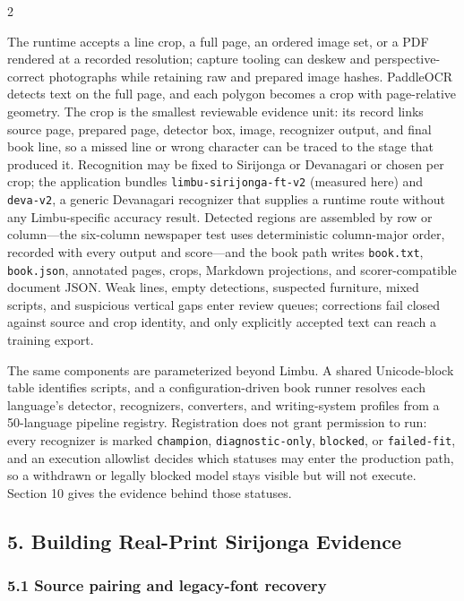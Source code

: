 \documentclass[
  10pt,
]{article}
\begin{document}
\begin{multicols}{2}

The runtime accepts a line crop, a full page, an ordered image set, or a
PDF rendered at a recorded resolution; capture tooling can deskew and
perspective-correct photographs while retaining raw and prepared image
hashes. PaddleOCR detects text on the full page, and each polygon
becomes a crop with page-relative geometry. The crop is the smallest
reviewable evidence unit: its record links source page, prepared page,
detector box, image, recognizer output, and final book line, so a missed
line or wrong character can be traced to the stage that produced it.
Recognition may be fixed to Sirijonga or Devanagari or chosen per crop;
the application bundles \texttt{limbu-sirijonga-ft-v2} (measured here)
and \texttt{deva-v2}, a generic Devanagari recognizer that supplies a
runtime route without any Limbu-specific accuracy result. Detected
regions are assembled by row or column---the six-column newspaper test
uses deterministic column-major order, recorded with every output and
score---and the book path writes \texttt{book.txt}, \texttt{book.json},
annotated pages, crops, Markdown projections, and scorer-compatible
document JSON. Weak lines, empty detections, suspected furniture, mixed
scripts, and suspicious vertical gaps enter review queues; corrections
fail closed against source and crop identity, and only explicitly
accepted text can reach a training export.

The same components are parameterized beyond Limbu. A shared
Unicode-block table identifies scripts, and a configuration-driven book
runner resolves each language's detector, recognizers, converters, and
writing-system profiles from a 50-language pipeline registry.
Registration does not grant permission to run: every recognizer is
marked \texttt{champion}, \texttt{diagnostic-only}, \texttt{blocked}, or
\texttt{failed-fit}, and an execution allowlist decides which statuses
may enter the production path, so a withdrawn or legally blocked model
stays visible but will not execute. Section 10 gives the evidence behind
those statuses.

\subsection{5. Building Real-Print Sirijonga
Evidence}\label{building-real-print-sirijonga-evidence}

\subsubsection{5.1 Source pairing and legacy-font
recovery}\label{source-pairing-and-legacy-font-recovery}


\end{multicols}
\end{document}
